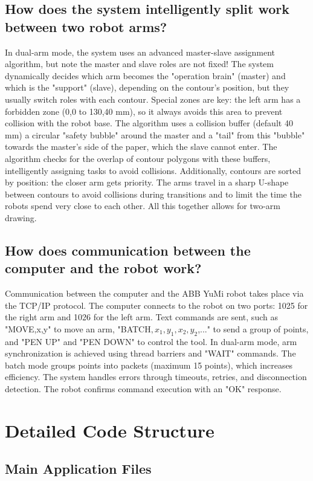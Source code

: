 \documentclass[a4paper,12pt]{article}
\begin{document}
\subsection{How does the system intelligently split work between two robot arms?}
In dual-arm mode, the system uses an advanced master-slave assignment algorithm, but note the master and slave roles are not fixed! The system dynamically decides which arm becomes the "operation brain" (master) and which is the "support" (slave), depending on the contour's position, but they usually switch roles with each contour. Special zones are key: the left arm has a forbidden zone (0,0 to 130,40 mm), so it always avoids this area to prevent collision with the robot base. The algorithm uses a collision buffer (default 40 mm) a circular "safety bubble" around the master and a "tail" from this "bubble" towards the master's side of the paper, which the slave cannot enter. The algorithm checks for the overlap of contour polygons with these buffers, intelligently assigning tasks to avoid collisions. Additionally, contours are sorted by position: the closer arm gets priority. The arms travel in a sharp U-shape between contours to avoid collisions during transitions and to limit the time the robots spend very close to each other. All this together allows for two-arm drawing.

\subsection{How does communication between the computer and the robot work?}
Communication between the computer and the ABB YuMi robot takes place via the TCP/IP protocol. The computer connects to the robot on two ports: 1025 for the right arm and 1026 for the left arm. Text commands are sent, such as "MOVE,x,y" to move an arm, "BATCH$,x_1,y_1,x_2,y_2$,..." to send a group of points, and "PEN UP" and "PEN DOWN" to control the tool. In dual-arm mode, arm synchronization is achieved using thread barriers and "WAIT" commands. The batch mode groups points into packets (maximum 15 points), which increases efficiency. The system handles errors through timeouts, retries, and disconnection detection. The robot confirms command execution with an "OK" response.

\section{Detailed Code Structure}

\subsection{Main Application Files}
\end{document}
